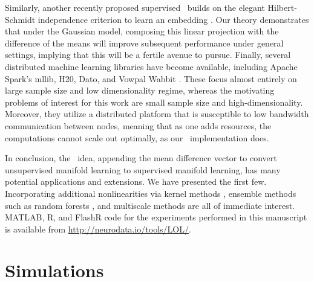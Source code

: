 \documentclass[10pt]{article}
\begin{document}
Similarly, another  recently proposed supervised \Pca~builds on the elegant Hilbert-Schmidt independence criterion \cite{Gretton05} to learn an embedding \cite{Barshan2011}.  Our theory demonstrates that under the Gaussian model, composing this linear projection with the difference of the means will improve subsequent performance under general settings, implying that this will be a fertile avenue to pursue.
%
Finally, several distributed machine learning libraries have become available, including Apache Spark's mllib,  H20, Dato, and Vowpal Wabbit \cite{Agarwal2014}.  These focus almost entirely on large sample size and low dimensionality regime, whereas the motivating problems of interest for this work are small sample size and high-dimensionality. Moreover, they utilize a distributed platform that is susceptible to low bandwidth communication between nodes, meaning that as one adds resources, the computations cannot scale out optimally, as our \Lol~implementation does.



%
In conclusion, the \Lol~idea, appending the mean difference vector to convert unsupervised manifold learning to supervised manifold learning, has many potential applications and extensions.  We have presented the first few.  Incorporating additional nonlinearities via kernel methods \cite{Mika1999a}, ensemble methods such as random forests \cite{Breiman2001a}, and multiscale methods \cite{Allard2012}
are all of immediate interest. 
MATLAB, R, and FlashR code for the experiments performed in this manuscript is available from \url{http://neurodata.io/tools/LOL/}.

\clearpage
\appendix

\section{Simulations}

\end{document}
